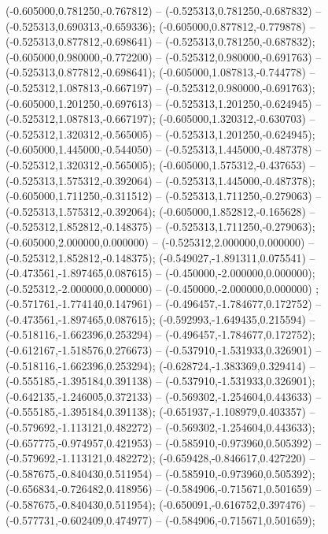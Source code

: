  (-0.605000,0.781250,-0.767812) -- (-0.525313,0.781250,-0.687832) -- (-0.525313,0.690313,-0.659336);
 (-0.605000,0.877812,-0.779878) -- (-0.525313,0.877812,-0.698641) -- (-0.525313,0.781250,-0.687832);
 (-0.605000,0.980000,-0.772200) -- (-0.525312,0.980000,-0.691763) -- (-0.525313,0.877812,-0.698641);
 (-0.605000,1.087813,-0.744778) -- (-0.525312,1.087813,-0.667197) -- (-0.525312,0.980000,-0.691763);
 (-0.605000,1.201250,-0.697613) -- (-0.525313,1.201250,-0.624945) -- (-0.525312,1.087813,-0.667197);
 (-0.605000,1.320312,-0.630703) -- (-0.525312,1.320312,-0.565005) -- (-0.525313,1.201250,-0.624945);
 (-0.605000,1.445000,-0.544050) -- (-0.525313,1.445000,-0.487378) -- (-0.525312,1.320312,-0.565005);
 (-0.605000,1.575312,-0.437653) -- (-0.525313,1.575312,-0.392064) -- (-0.525313,1.445000,-0.487378);
 (-0.605000,1.711250,-0.311512) -- (-0.525313,1.711250,-0.279063) -- (-0.525313,1.575312,-0.392064);
 (-0.605000,1.852812,-0.165628) -- (-0.525312,1.852812,-0.148375) -- (-0.525313,1.711250,-0.279063);
 (-0.605000,2.000000,0.000000) -- (-0.525312,2.000000,0.000000) -- (-0.525312,1.852812,-0.148375);
 (-0.549027,-1.891311,0.075541) -- (-0.473561,-1.897465,0.087615) -- (-0.450000,-2.000000,0.000000);
 (-0.525312,-2.000000,0.000000) -- (-0.450000,-2.000000,0.000000) ;
 (-0.571761,-1.774140,0.147961) -- (-0.496457,-1.784677,0.172752) -- (-0.473561,-1.897465,0.087615);
 (-0.592993,-1.649435,0.215594) -- (-0.518116,-1.662396,0.253294) -- (-0.496457,-1.784677,0.172752);
 (-0.612167,-1.518576,0.276673) -- (-0.537910,-1.531933,0.326901) -- (-0.518116,-1.662396,0.253294);
 (-0.628724,-1.383369,0.329414) -- (-0.555185,-1.395184,0.391138) -- (-0.537910,-1.531933,0.326901);
 (-0.642135,-1.246005,0.372133) -- (-0.569302,-1.254604,0.443633) -- (-0.555185,-1.395184,0.391138);
 (-0.651937,-1.108979,0.403357) -- (-0.579692,-1.113121,0.482272) -- (-0.569302,-1.254604,0.443633);
 (-0.657775,-0.974957,0.421953) -- (-0.585910,-0.973960,0.505392) -- (-0.579692,-1.113121,0.482272);
 (-0.659428,-0.846617,0.427220) -- (-0.587675,-0.840430,0.511954) -- (-0.585910,-0.973960,0.505392);
 (-0.656834,-0.726482,0.418956) -- (-0.584906,-0.715671,0.501659) -- (-0.587675,-0.840430,0.511954);
 (-0.650091,-0.616752,0.397476) -- (-0.577731,-0.602409,0.474977) -- (-0.584906,-0.715671,0.501659);
